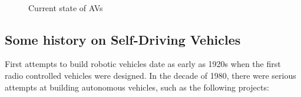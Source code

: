 \begin{figure}[htb]
  \myfloatalign
   \quad
   \\
   \quad
  \caption[Current state of AVs]{Current state of AVs}
  \label{fig:auton_vehic}
\end{figure}

\subsection{Some history on Self-Driving Vehicles}

First attempts to build robotic vehicles date as early as 1920s  when the first radio controlled vehicles were designed. In the decade of 1980, there were serious attempts at building autonomous vehicles, such as the following projects:


